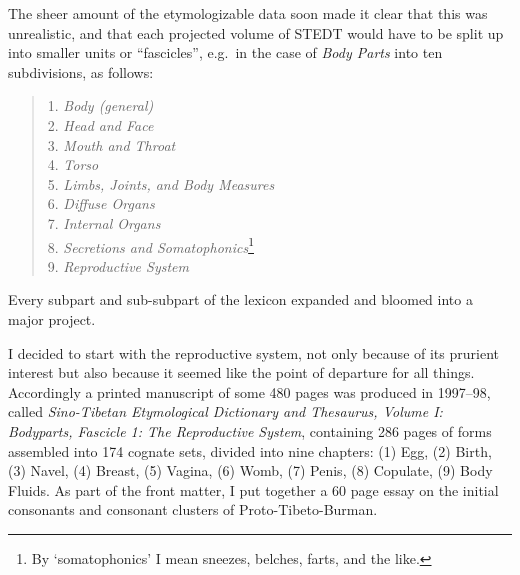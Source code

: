  The sheer amount of the etymologizable data soon made it clear that this was unrealistic, and that each projected volume of STEDT would have to be split up into smaller units or “fascicles”, e.g.\ in the case of \textit{Body Parts} into ten subdivisions, as follows:

\begin{quote}
{\footnotesize
1. \textit{Body (general)}\\
2. \textit{Head and Face}\\
3. \textit{Mouth and Throat}\\
4. \textit{Torso}\\
5. \textit{Limbs, Joints, and Body Measures}\\
6. \textit{Diffuse Organs}\\
7. \textit{Internal Organs}\\
8. \textit{Secretions and Somatophonics}\footnote{By ‘somatophonics’ I mean sneezes,
belches, farts, and the like.}\\
9. \textit{Reproductive System}\\
}
\end{quote}

Every subpart and sub-subpart of the lexicon expanded and bloomed into a major project.

I decided to start with the reproductive system, not only because of its prurient interest but also because it seemed like the point of departure for all things. Accordingly a printed manuscript of some 480 pages was produced in 1997–98, called \textit{Sino-Tibetan Etymological Dictionary and Thesaurus, Volume I: Bodyparts, Fascicle 1: The Reproductive System}, containing 286 pages of forms assembled into 174 cognate sets, divided into nine chapters: (1) Egg, (2) Birth, (3) Navel, (4) Breast, (5) Vagina, (6) Womb, (7) Penis, (8) Copulate, (9) Body Fluids. As part of the front matter, I put together a 60 page essay on the initial consonants and consonant clusters of Proto-Tibeto-Burman.

